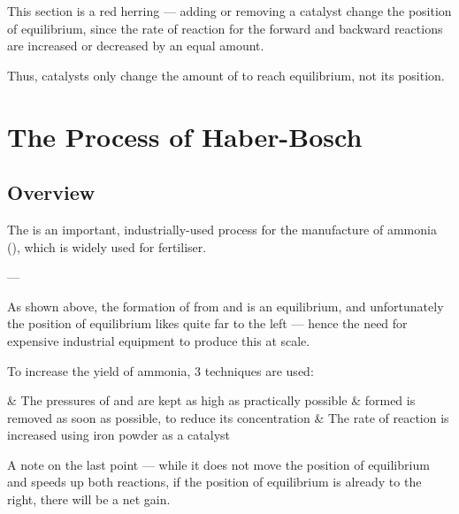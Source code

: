 			This section is a red herring --- adding or removing a catalyst  change the position of equilibrium, since the
			rate of reaction for  the forward and backward reactions are increased or decreased by an equal amount.

			Thus, catalysts only change the amount of  to reach equilibrium, not its position.




	\pagebreak
	\section{The Process of Haber-Bosch}

		\subsection{Overview}

			The  is an important, industrially-used process for the manufacture of ammonia (), which is widely
			used for fertiliser.


			--- 

			As shown above, the formation of  from  and  is an equilibrium, and unfortunately the position of equilibrium
			likes quite far to the left --- hence the need for expensive industrial equipment to produce this at scale.




			To increase the yield of ammonia, 3 techniques are used:


			\begin{bulletlist}
				& The pressures of  and  are kept as high as practically possible
				&  formed is removed as soon as possible, to reduce its concentration
				& The rate of reaction is increased using iron powder as a catalyst
			\end{bulletlist}

			A note on the last point --- while it does not move the position of equilibrium and speeds up both reactions, if the
			position of equilibrium is already to the right, there will be a net gain.

